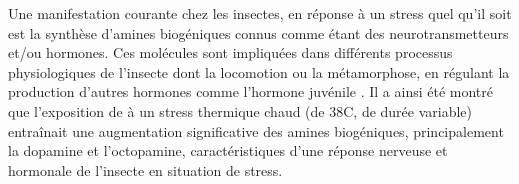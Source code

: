 		Une manifestation courante chez les insectes, en réponse à un stress quel qu'il soit est la synthèse d'amines biogéniques connus comme étant des neurotransmetteurs et/ou hormones.
		Ces molécules sont impliquées dans différents processus physiologiques de l'insecte dont la locomotion ou la métamorphose, en régulant la production d'autres hormones comme l'hormone juvénile \cite{hirashima2000}.
		Il a ainsi été montré que l'exposition de  à un stress thermique chaud (de 38\textdegree{}C, de durée variable) entraînait une augmentation significative des amines biogéniques, principalement la dopamine et l'octopamine, caractéristiques d'une réponse nerveuse et hormonale de l'insecte en situation de stress.


